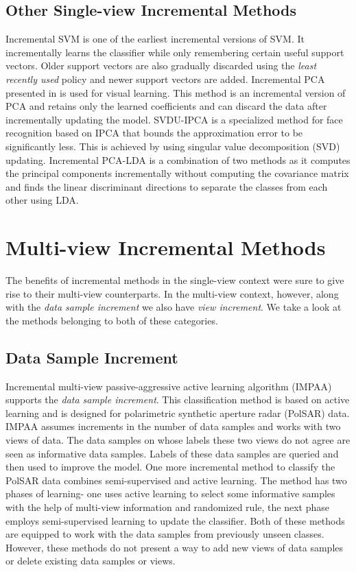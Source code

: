 \subsection{Other Single-view Incremental Methods}
\label{subs:Lit_Inc_Other}
Incremental SVM \cite{XiaoWZ00} is one of the earliest incremental versions of SVM. It incrementally learns the classifier while only remembering certain useful support vectors. Older support vectors are also gradually discarded using the \textit{least recently used} policy and newer support vectors are added. Incremental PCA presented in \cite{ArtacJL02} is used for visual learning. This method is an incremental version of PCA and retains only the learned coefficients and can discard the data after incrementally updating the model. SVDU-IPCA \cite{ZhaoYK06} is a specialized method for face recognition based on IPCA that bounds the approximation error to be significantly less. This is achieved by using singular value decomposition (SVD) updating. Incremental PCA-LDA \cite{Dagher10} is a combination of two methods as it computes the principal components incrementally without computing the covariance matrix and finds the linear discriminant directions to separate the classes from each other using LDA.










\section{Multi-view Incremental Methods}
\label{sec:Lit_MvInc}
The benefits of incremental methods in the single-view context were sure to give rise to their multi-view counterparts. In the multi-view context, however, along with the \textit{data sample increment} we also have \textit{view increment}. We take a look at the methods belonging to both of these categories.


\subsection{Data Sample Increment}
\label{Lit_MvInc_Data}
Incremental multi-view passive-aggressive active learning algorithm (IMPAA) \cite{NieLQZJ18} supports the \textit{data sample increment}. This classification method is based on active learning and is designed for polarimetric synthetic aperture radar (PolSAR) data. IMPAA assumes increments in the number of data samples and works with two views of data. The data samples on whose labels these two views do not agree are seen as informative data samples. Labels of these data samples are queried and then used to improve the model. One more incremental method \cite{NieFHYZM20} to classify the PolSAR data combines semi-supervised and active learning. The method has two phases of learning- one uses active learning to select some informative samples with the help of multi-view information and randomized rule, the next phase employs semi-supervised learning to update the classifier. Both of these methods are equipped to work with the data samples from previously unseen classes. However, these methods do not present a way to add new views of data samples or delete existing data samples or views.


